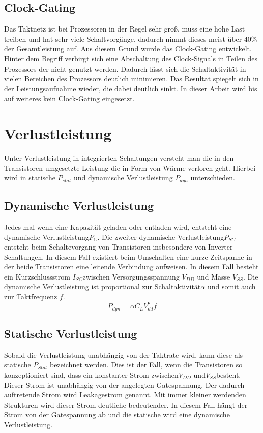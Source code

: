 \subsection{Clock-Gating}\label{subsec:clock-gate}
Das Taktnetz ist bei Prozessoren in der Regel sehr groß, muss eine hohe Last treiben und hat sehr viele Schaltvorgänge, dadurch nimmt dieses meist über 40\% der Gesamtleistung auf. Aus diesem Grund wurde das Clock-Gating entwickelt. Hinter dem Begriff verbirgt sich eine Abschaltung des Clock-Signals in Teilen des Prozessors der nicht genutzt werden. Dadurch lässt sich die Schaltaktivität in vielen Bereichen des Prozessors deutlich minimieren. Das Resultat spiegelt sich in der Leistungsaufnahme wieder, die dabei deutlich sinkt.\cite{donno2003clock} In dieser Arbeit wird bis auf weiteres kein Clock-Gating eingesetzt.

\section{Verlustleistung}
\label{sec:verlustleistung}
Unter Verlustleistung in integrierten Schaltungen versteht man die in den Transistoren umgesetzte Leistung die in Form von Wärme verloren geht.
Hierbei wird in statische \(P_{stat}\) und dynamische Verlustleistung \(P_{dyn}\) unterschieden. \cite[Seite 4 ff.]{flynn2007low}
\subsection{Dynamische Verlustleistung}\label{subsec:dynVerl}
Jedes mal wenn eine Kapazität geladen oder entladen wird, entsteht eine dynamische Verlustleistung\(P_C\). Die zweiter dynamische Verlustleistung\(P_{SC}\) entsteht beim Schaltevorgang von Transistoren insbesondere von Inverter-Schaltungen. In diesem Fall existiert beim Umschalten eine kurze Zeitspanne in der beide Transistoren eine leitende Verbindung aufweisen. In diesem Fall besteht ein Kurzschlussstrom \(I_{SC}\)zwischen Versorgungsspannung \(V_{DD}\) und Masse \(V_{SS}\). Die dynamische Verlustleistung ist proportional zur Schaltaktivität\(\alpha\) und somit auch zur Taktfrequenz $f$.\cite[Seite 4 ff.]{flynn2007low}
\begin{equation}
P_{dyn} = \alpha  C_L  V_{dd}^{2}  f
\label{eq:dynVerlustleistung}
\end{equation}
\subsection{Statische Verlustleistung}\label{subsec:statVerl}
Sobald die Verlustleistung unabhängig von der Taktrate wird, kann diese als statische \(P_{Stat}\) bezeichnet werden. Dies ist der Fall, wenn die Transistoren so konzeptioniert sind, dass ein konstanter Strom zwischen\(V_{DD}\) und\(V_{SS}\)besteht. Dieser Strom ist unabhängig von der angelegten Gatespannung. Der dadurch auftretende Strom wird Leakagestrom genannt. Mit immer kleiner werdenden Strukturen wird dieser Strom deutliche bedeutender. In diesem Fall hängt der Strom von der Gatespannung ab und die statische wird eine dynamische Verlustleistung.\cite[Seite 8]{flynn2007low}


